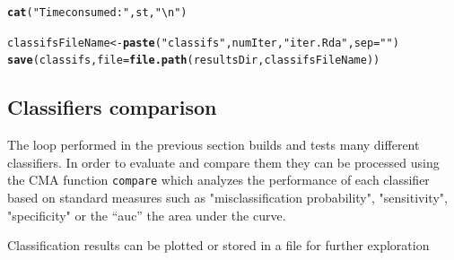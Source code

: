\documentclass{article}\usepackage[]{graphicx}\usepackage[]{color}
\makeatletter
\newcommand{\hlstr}[1]{\textcolor[rgb]{0.192,0.494,0.8}{#1}}%
\newcommand{\hlstd}[1]{\textcolor[rgb]{0.345,0.345,0.345}{#1}}%
\newcommand{\hlkwb}[1]{\textcolor[rgb]{0.69,0.353,0.396}{#1}}%
\newcommand{\hlkwc}[1]{\textcolor[rgb]{0.333,0.667,0.333}{#1}}%
\newcommand{\hlkwd}[1]{\textcolor[rgb]{0.737,0.353,0.396}{\textbf{#1}}}%
\newenvironment{kframe}{%
 \def\at@end@of@kframe{}%
 \ifinner\ifhmode%
  \def\at@end@of@kframe{\end{minipage}}%
  \begin{minipage}{\columnwidth}%
 \fi\fi%
 \def\FrameCommand##1{\hskip\@totalleftmargin \hskip-\fboxsep
 \colorbox{shadecolor}{##1}\hskip-\fboxsep
     \hskip-\linewidth \hskip-\@totalleftmargin \hskip\columnwidth}%
 \MakeFramed {\advance\hsize-\width
   \@totalleftmargin\z@ \linewidth\hsize
   \@setminipage}}%
 {\par\unskip\endMakeFramed%
 \at@end@of@kframe}
\newenvironment{knitrout}{}{} %
\makeatother
\begin{document}
\begin{knitrout}
\begin{kframe}
{\ttfamily\noindent\color{warningcolor}{\#\# Warning: package 'class' was built under R version 3.1.3}}

{\ttfamily\noindent\color{warningcolor}{\#\# Warning in library(package, lib.loc = lib.loc, character.only = TRUE, logical.return = TRUE, : there is no package called 'randomForest'}}

{\ttfamily\noindent\bfseries{}}\begin{alltt}
\hlkwd{cat}\hlstd{(}\hlstr{"Time consumed: "}\hlstd{, st,} \hlstr{"\textbackslash{}n"}\hlstd{)}
\end{alltt}


{\ttfamily\noindent\bfseries{}}\begin{alltt}
\hlstd{classifsFileName} \hlkwb{<-} \hlkwd{paste}\hlstd{(}\hlstr{"classifs"}\hlstd{,numIter,}\hlstr{"iter.Rda"}\hlstd{,} \hlkwc{sep}\hlstd{=}\hlstr{""}\hlstd{)}
\hlkwd{save}\hlstd{(classifs,} \hlkwc{file}\hlstd{=}\hlkwd{file.path}\hlstd{(resultsDir,classifsFileName))}
\end{alltt}
\end{kframe}
\end{knitrout}

\subsection{Classifiers comparison}

The loop performed in the previous section builds and tests many different classifiers. In order to evaluate and compare them they can be processed using the CMA function \texttt{compare} which analyzes the performance of each classifier based on standard measures such as "misclassification probability", "sensitivity", "specificity" or the ``auc'' the area under the curve.

Classification results can be plotted or stored in a file for further exploration
\end{document}
